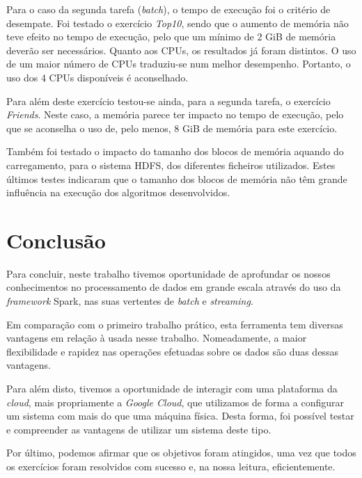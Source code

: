 \documentclass[a4paper]{report}
\begin{document}
    Para o caso da segunda tarefa (\textit{batch}), o tempo de execução foi o critério de desempate.
    Foi testado o exercício \textit{Top10}, sendo que o aumento de memória não teve efeito no tempo de execução, pelo que um mínimo de 2 GiB de memória deverão ser necessários.
    Quanto aos CPUs, os resultados já foram distintos. O uso de um maior número de CPUs traduziu-se num melhor desempenho. Portanto, o uso dos 4 CPUs disponíveis é aconselhado.
    
    Para além deste exercício testou-se ainda, para a segunda tarefa, o exercício \textit{Friends}. 
    Neste caso, a memória parece ter impacto no tempo de execução, pelo que se aconselha o uso de, pelo menos, 8 GiB de memória para este exercício.

    Também foi testado o impacto do tamanho dos blocos de memória aquando do carregamento, para o sistema HDFS, dos diferentes ficheiros utilizados.
    Estes últimos testes indicaram que o tamanho dos blocos de memória não têm grande influência na execução dos algoritmos desenvolvidos.


\chapter{Conclusão} \label{ch:Conclusion}
\large{
    Para concluir, neste trabalho tivemos oportunidade de aprofundar os nossos conhecimentos no processamento de dados em grande escala através do uso da \textit{framework} Spark, nas suas vertentes de \textit{batch} e \textit{streaming}.

    Em comparação com o primeiro trabalho prático, esta ferramenta tem diversas vantagens em relação à usada nesse trabalho.
    Nomeadamente, a maior flexibilidade e rapidez nas operações efetuadas sobre os dados são duas dessas vantagens.

    Para além disto, tivemos a oportunidade de interagir com uma plataforma da \textit{cloud}, mais propriamente a \textit{Google Cloud}, que utilizamos de forma a configurar um sistema com mais do que uma máquina física.
    Desta forma, foi possível testar e compreender as vantagens de utilizar um sistema deste tipo.

    Por último, podemos afirmar que os objetivos foram atingidos, uma vez que todos os exercícios foram resolvidos com sucesso e, na nossa leitura, eficientemente.
}

\appendix
\end{document}
